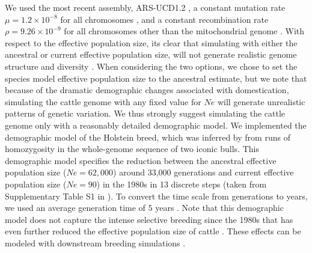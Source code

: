 \documentclass[hidelinks]{article}
\begin{document}
We used the most recent assembly, ARS-UCD1.2
\citep{Rosen2020}, a constant mutation rate \(\mu=1.2\times 10^{-8}\) for all chromosomes \citep{Harland2017}, and a constant recombination rate \(\rho=9.26 \times 10^{-9}\) for all chromosomes other than the mitochondrial genome \citep{Ma2015}.
%
With respect to the effective population size, its clear that simulating with either the ancestral or current effective population size, will not generate realistic genome structure and diversity \citep{MacLeod2013,Rosen2020}. 
%
When considering the two options, we chose to set the species model effective population size to the ancestral estimate, but we note that because of the dramatic demographic changes associated with domestication, simulating the cattle genome with any fixed value for $Ne$ will generate unrealistic patterns of genetic variation.
%
We thus strongly suggest simulating the cattle genome only with a reasonably detailed demographic model.
%
We implemented the demographic model of the Holstein breed, which was
inferred by \cite{MacLeod2013} from runs of homozygosity in the whole-genome sequence of two iconic bulls. 
%
This demographic model specifies the reduction between the ancestral effective population size ($Ne=62,000$) around 33,000 generations and current effective population size ($Ne=90$) in the 1980s in 13 discrete steps (taken from Supplementary Table S1 in \cite{MacLeod2013}). 
%
To convert the time scale from generations to years, we used an average generation time of $5$ years \citep{MacLeod2013}.
%
Note that this demographic model does not capture the intense selective breeding since the 1980s that has even further reduced the effective population size of cattle \citep{MacLeod2013, VanRaden2020, Makanjouloa2020}. These effects can be modeled with
downstream breeding simulations \citep[e.g.,][]{Gaynor2020}.
%
\end{document}
